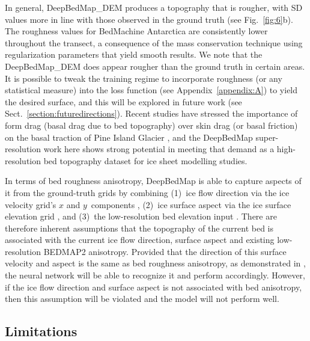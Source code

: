 In general, DeepBedMap\_DEM produces a topography that is rougher, with SD values more in line with those observed in the ground truth (see Fig.~\ref{fig:6}b).
The roughness values for BedMachine Antarctica are consistently lower throughout the transect, a consequence of the mass conservation technique using regularization parameters that yield smooth results.
We note that the DeepBedMap\_DEM does appear rougher than the ground truth in certain areas.
It is possible to tweak the training regime to incorporate roughness (or any statistical measure) into the loss function (see Appendix~\ref{appendix:A}) to yield the desired surface, and this will be explored in future work (see Sect.~\ref{section:futuredirections}).
Recent studies have stressed the importance of form drag (basal drag due to bed topography) over skin drag (or basal friction) on the basal traction of Pine Island Glacier \citep{BinghamDiverselandscapesPine2017,Kyrke-SmithRelevanceDetailBasal2018}, and the DeepBedMap super-resolution work here shows strong potential in meeting that demand as a high-resolution bed topography dataset for ice sheet modelling studies.

In terms of bed roughness anisotropy, DeepBedMap is able to capture aspects of it from the ground-truth grids by combining (1)~ice flow direction via the ice velocity grid's $x$ and $y$~components \citep{MouginotMEaSUREsPhaseMap2019}, (2)~ice surface aspect via the ice surface elevation grid \citep{HowatReferenceElevationModel2019}, and (3)~the low-resolution bed elevation input \citep{FretwellBedmap2improvedice2013}.
There are therefore inherent assumptions that the topography of the current bed is associated with the current ice flow direction, surface aspect and existing low-resolution BEDMAP2 anisotropy.
Provided that the direction of this surface velocity and aspect is the same as bed roughness anisotropy, as demonstrated in \citet{HolschuhLinkingpostglaciallandscapes2020}, the neural network will be able to recognize it and perform accordingly.
However, if the ice flow direction and surface aspect is not associated with bed anisotropy, then this assumption will be violated and the model will not perform well.

\subsection{Limitations}

